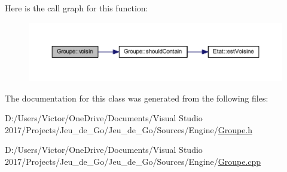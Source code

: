 Here is the call graph for this function\+:
\nopagebreak
\begin{figure}[H]
\begin{center}
\leavevmode
\includegraphics[width=350pt]{class_groupe_a13537bf2de72a097dd9ee102d14686d5_cgraph}
\end{center}
\end{figure}


The documentation for this class was generated from the following files\+:\begin{DoxyCompactItemize}
\item 
D\+:/\+Users/\+Victor/\+One\+Drive/\+Documents/\+Visual Studio 2017/\+Projects/\+Jeu\+\_\+de\+\_\+\+Go/\+Jeu\+\_\+de\+\_\+\+Go/\+Sources/\+Engine/\hyperlink{_groupe_8h}{Groupe.\+h}\item 
D\+:/\+Users/\+Victor/\+One\+Drive/\+Documents/\+Visual Studio 2017/\+Projects/\+Jeu\+\_\+de\+\_\+\+Go/\+Jeu\+\_\+de\+\_\+\+Go/\+Sources/\+Engine/\hyperlink{_groupe_8cpp}{Groupe.\+cpp}\end{DoxyCompactItemize}
